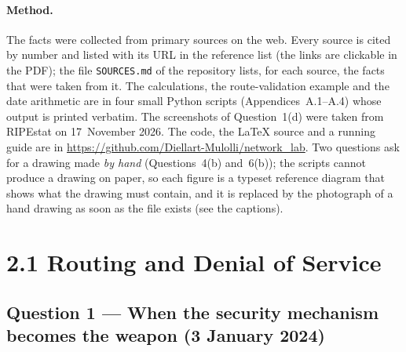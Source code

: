 \documentclass[11pt,a4paper]{article}
\newcommand{\code}[1]{\texttt{#1}}
\begin{document}
\paragraph{Method.} The facts were collected from primary sources on the web. Every source is cited by number and listed
with its URL in the reference list (the links are clickable in the PDF); the file \code{SOURCES.md} of the repository lists,
for each source, the facts that were taken from it. The calculations, the route-validation example and the date arithmetic are in four small
Python scripts (Appendices~A.1--A.4) whose output is printed verbatim. The screenshots of Question~1(d) were taken from RIPEstat on 17~November 2026.
The code, the LaTeX source and a running guide are in \url{https://github.com/Diellart-Mulolli/network_lab}. Two questions ask for a drawing made \emph{by hand}
(Questions~4(b) and~6(b)); the scripts cannot produce a drawing on paper, so each figure is a typeset reference diagram that shows what the drawing must
contain, and it is replaced by the photograph of a hand drawing as soon as the file exists (see the captions).

\section*{2.1 Routing and Denial of Service}

\subsection*{Question 1 --- When the security mechanism becomes the weapon (3 January 2024)}
\end{document}
